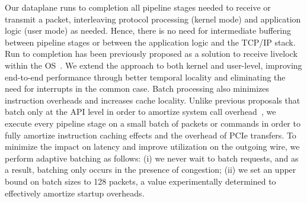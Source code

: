 

 Our dataplane
runs to completion all pipeline stages needed to receive or transmit a
packet, interleaving protocol processing (kernel mode) and application
logic (user mode) as needed. Hence, there is no need for intermediate
buffering between pipeline stages or between the application logic and
the TCP/IP stack.  Run to completion has been
previously proposed as a solution to receive livelock within the OS~\cite{receivelivelock}. We extend the approach to
both kernel and user-level, improving
end-to-end performance through better temporal locality and eliminating
the need for interrupts in the common case.  Batch processing also minimizes instruction overheads and
increases cache locality.  Unlike previous proposals that batch only
at the API level in order to amortize system call
overhead~\cite{jeong2014mtcp,han2012megapipe,soares2010flexsc}, we execute every
pipeline stage on a small batch of packets or commands in order to
fully amortize instruction caching effects and the overhead of PCIe
transfers. To minimize the impact on latency and improve utilization on
the outgoing wire, we perform adaptive batching as follows: (i) we
never wait to batch requests, and as a result, batching only occurs
in the presence of congestion; (ii) we set an upper bound on batch
sizes to 128 packets, a value experimentally determined to effectively
amortize startup overheads.


